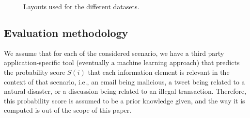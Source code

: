 \begin{figure}[t]
\begin{centering}
\par\end{centering}
\caption{Layouts used for the different datasets.}
\end{figure}

\subsection{Evaluation methodology}

We assume that for each of the considered scenario,  we have a third party application-specific tool (eventually a machine learning approach)  that predicts the probability score $S(i)$ that each information element is relevant in the context of that scenario, i.e., an email being malicious, a tweet being related to a natural disaster, or a discussion being related to an illegal transaction. Therefore, this probability score is assumed to be a prior knowledge given, and the way it is computed is out of the scope of this paper. 

